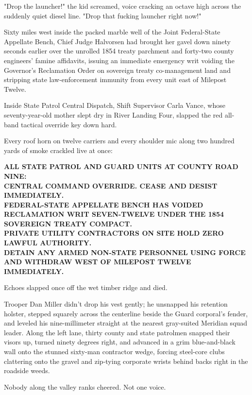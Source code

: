 "Drop the launcher!" the kid screamed, voice cracking an octave high across the suddenly quiet diesel line. "Drop that fucking launcher right now!"

Sixty miles west inside the packed marble well of the Joint Federal-State Appellate Bench, Chief Judge Halvorsen had brought her gavel down ninety seconds earlier over the unrolled 1854 treaty parchment and forty-two county engineers' famine affidavits, issuing an immediate emergency writ voiding the Governor's Reclamation Order on sovereign treaty co-management land and stripping state law-enforcement immunity from every unit east of Milepost Twelve.

Inside State Patrol Central Dispatch, Shift Supervisor Carla Vance, whose seventy-year-old mother slept dry in River Landing Four, slapped the red all-band tactical override key down hard.

Every roof horn on twelve carriers and every shoulder mic along two hundred yards of smoke crackled live at once:

\begin{center}
\textbf{ALL STATE PATROL AND GUARD UNITS AT COUNTY ROAD NINE:}\\
\textbf{CENTRAL COMMAND OVERRIDE. CEASE AND DESIST IMMEDIATELY.}\\
\textbf{FEDERAL-STATE APPELLATE BENCH HAS VOIDED RECLAMATION WRIT SEVEN-TWELVE UNDER THE 1854 SOVEREIGN TREATY COMPACT.}\\
\textbf{PRIVATE UTILITY CONTRACTORS ON SITE HOLD ZERO LAWFUL AUTHORITY.}\\
\textbf{DETAIN ANY ARMED NON-STATE PERSONNEL USING FORCE AND WITHDRAW WEST OF MILEPOST TWELVE IMMEDIATELY.}
\end{center}

Echoes slapped once off the wet timber ridge and died.

Trooper Dan Miller didn't drop his vest gently; he unsnapped his retention holster, stepped squarely across the centerline beside the Guard corporal's fender, and leveled his nine-millimeter straight at the nearest gray-suited Meridian squad leader. Along the left lane, thirty county and state patrolmen snapped their visors up, turned ninety degrees right, and advanced in a grim blue-and-black wall onto the stunned sixty-man contractor wedge, forcing steel-core clubs clattering onto the gravel and zip-tying corporate wrists behind backs right in the roadside weeds.

Nobody along the valley ranks cheered. Not one voice.


